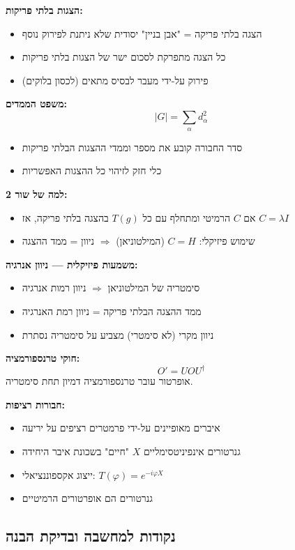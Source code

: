 \begin{summarybox}{}
\textbf{הצגות בלתי פריקות:}
\begin{itemize}
    \item הצגה בלתי פריקה = "אבן בניין" יסודית שלא ניתנת לפירוק נוסף
    \item כל הצגה מתפרקת לסכום ישר של הצגות בלתי פריקות
    \item פירוק על-ידי מעבר לבסיס מתאים (לכסון בלוקים)
\end{itemize}

\textbf{משפט הממדים:}
\[
|G| = \sum_{\alpha} d_\alpha^2
\]
\begin{itemize}
    \item סדר החבורה קובע את מספר וממדי ההצגות הבלתי פריקות
    \item כלי חזק לזיהוי כל ההצגות האפשריות
\end{itemize}

\textbf{למה של שור 2:}
\begin{itemize}
    \item אם $C$ הרמיטי ומתחלף עם כל $T(g)$ בהצגה בלתי פריקה, אז $C = \lambda I$
    \item שימוש פיזיקלי: $C = H$ (המילטוניאן) $\Rightarrow$ ניוון = ממד ההצגה
\end{itemize}

\textbf{משמעות פיזיקלית — ניוון אנרגיה:}
\begin{itemize}
    \item סימטריה של המילטוניאן $\Rightarrow$ ניוון רמות אנרגיה
    \item ממד ההצגה הבלתי פריקה = ניוון רמת האנרגיה
    \item ניוון מקרי (לא סימטרי) מצביע על סימטריה נסתרת
\end{itemize}

\textbf{חוקי טרנספורמציה:}
\[
O' = U O U^\dagger
\]
אופרטור עובר טרנספורמציה דמיון תחת סימטריה.

\textbf{חבורות רציפות:}
\begin{itemize}
    \item איברים מאופיינים על-ידי פרמטרים רציפים על יריעה
    \item גנרטורים אינפיניטסימליים $X$ "חיים" בשכונת איבר היחידה
    \item ייצוג אקספוננציאלי: $T(\varphi) = e^{-i\varphi X}$
    \item גנרטורים הם אופרטורים הרמיטיים
\end{itemize}
\end{summarybox}

\subsection*{נקודות למחשבה ובדיקת הבנה}

